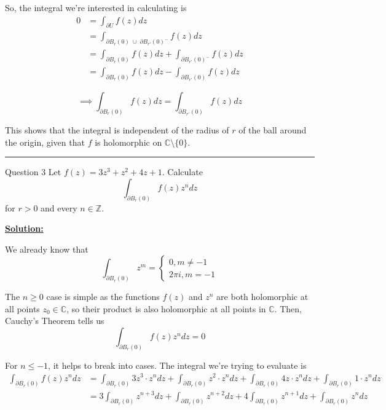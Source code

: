 \documentclass{article}
\newcommand{\C}{\mathbb{C}}
\begin{document}
So, the integral we're interested in calculating is 
\begin{align*}
  0 &= \int_{\partial U} f(z) dz \\
  &= \int_{\partial B_r(0) \;\cup\; \partial B_{r'}(0)^{-}} f(z) dz \\
  &= \int_{\partial B_r(0)} f(z) dz + \int_{\partial B_{r'}(0)^{-}} f(z) dz \\
  &= \int_{\partial B_r(0)} f(z) dz - \int_{\partial B_{r'}(0)} f(z) dz
\end{align*}

\[ \implies \boxed{\int_{\partial B_r(0)} f(z) dz = \int_{\partial B_{r'}(0)} f(z) dz} \]

\vskip 0.25cm
This shows that the integral is independent of the radius of $r$ of the ball around the origin, given that $f$ is holomorphic on $\C \setminus \{0\}$.

\vskip 0.5cm
\hrule 
\vskip 0.5cm


\begin{mathdefinitionbox}{Question 3}
\vskip 0.5cm
Let $f(z) = 3z^3 + z^2 + 4z + 1$. Calculate 
\[ \int_{\partial B_r(0)} f(z)z^n dz \]
for $r > 0$ and every $n \in \mathbb{Z}$.
\end{mathdefinitionbox}

\vskip 0.5cm
\underline{\textbf{Solution:}}

We already know that 
\[ \int_{\partial B_r(0)} z^m = \begin{cases}
  0, m \neq -1 \\
  2\pi i, m = -1
\end{cases} \]

\vskip 0.5cm
The $n \geq 0$ case is simple as the functions $f(z)$ and $z^n$ are both holomorphic at all points $z_0 \in \C$, so their product is also holomorphic at all points in $\C$. Then, Cauchy's Theorem tells us 
\[ \int_{\partial B_r(0)} f(z)z^n dz = 0 \] 


\vskip 0.5cm
For $n \leq -1$, it helps to break into cases. The integral we're trying to evaluate is
\begin{align*}
  \int_{\partial B_r(0)} f(z)z^n dz &= \int_{\partial B_r(0)} 3z^3 \cdot z^n dz + \int_{\partial B_r(0)} z^2 \cdot z^n dz + \int_{\partial B_r(0)} 4z \cdot z^n dz + \int_{\partial B_r(0)} 1 \cdot z^n dz \\
  &= 3\int_{\partial B_r(0)}z^{n+3} dz + \int_{\partial B_r(0)} z^{n+2} dz + 4\int_{\partial B_r(0)} z^{n+1} dz + \int_{\partial B_r(0)} z^n dz 
\end{align*}
\end{document}
